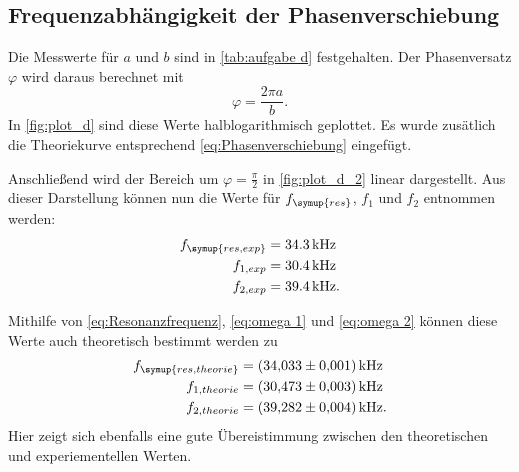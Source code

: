 \subsection{Frequenzabhängigkeit der Phasenverschiebung}
\label{sec:Frequenzabhängigkeit der Phasenverschiebung}

Die Messwerte für $a$ und $b$ sind in \autoref{tab:aufgabe d} festgehalten.
Der Phasenversatz $\varphi$ wird daraus berechnet mit
\begin{equation}
  \varphi=\frac{2\pi a}{b}.
\end{equation}
In \autoref{fig:plot_d} sind diese Werte halblogarithmisch geplottet.
Es wurde zusätlich die Theoriekurve entsprechend \eqref{eq:Phasenverschiebung} eingefügt.

Anschließend wird der Bereich um $\varphi=\frac{\pi}{2}$ in \autoref{fig:plot_d_2} linear dargestellt.
Aus dieser Darstellung können nun die Werte für $f_{\symup{res}}$, $f_{1}$ und $f_{2}$ entnommen werden:
\begin{align*}
  f_{\symup{res, exp}} &= 34.3\,\unit{\kilo\hertz} \\
  f_{1,exp} &= 30.4\,\unit{\kilo\hertz} \\
  f_{2,exp} &= 39.4\,\unit{\kilo\hertz}.
\end{align*}

Mithilfe von \eqref{eq:Resonanzfrequenz}, \eqref{eq:omega 1} und \eqref{eq:omega 2} können diese Werte auch theoretisch bestimmt werden zu
\begin{align*}
  f_{\symup{res, theorie}} &= \qty{34.033+-0.001}{\kilo\hertz} \\
  f_{1,theorie} &= \qty{30.473+-0.003}{\kilo\hertz} \\
  f_{2,theorie} &= \qty{39.282+-0.004}{\kilo\hertz}.
\end{align*}
Hier zeigt sich ebenfalls eine gute Übereistimmung zwischen den theoretischen und experiementellen Werten.

